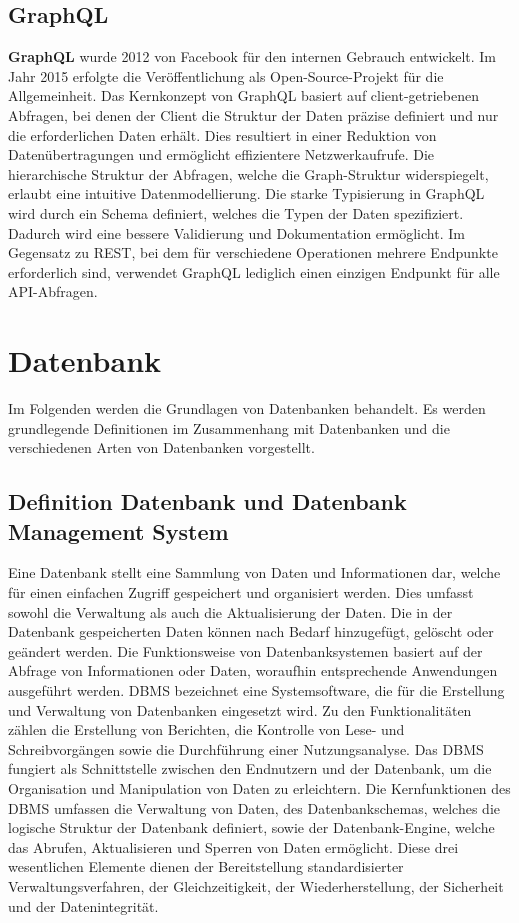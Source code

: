 \subsection{GraphQL} %
\label{sec:graphql}
\textbf{GraphQL} wurde 2012 von Facebook für den internen Gebrauch entwickelt. Im Jahr 2015 erfolgte die Veröffentlichung als Open-Source-Projekt für die Allgemeinheit. Das Kernkonzept von GraphQL basiert auf client-getriebenen Abfragen, bei denen der Client die Struktur der Daten präzise definiert und nur die erforderlichen Daten erhält. Dies resultiert in einer Reduktion von Datenübertragungen und ermöglicht effizientere Netzwerkaufrufe. Die hierarchische Struktur der Abfragen, welche die Graph-Struktur widerspiegelt, erlaubt eine intuitive Datenmodellierung. Die starke Typisierung in GraphQL wird durch ein Schema definiert, welches die Typen der Daten spezifiziert. Dadurch wird eine bessere Validierung und Dokumentation ermöglicht. Im Gegensatz zu REST, bei dem für verschiedene Operationen mehrere Endpunkte erforderlich sind, verwendet GraphQL lediglich einen einzigen Endpunkt für alle API-Abfragen.  \citep{graphqlreplacerest}

\section{Datenbank} %
\label{sec:datenbankGrundlagen}
Im Folgenden werden die Grundlagen von Datenbanken behandelt. Es werden grundlegende Definitionen im Zusammenhang mit Datenbanken und die verschiedenen Arten von Datenbanken vorgestellt.
\subsection{Definition Datenbank und Datenbank Management System} %
\label{sec:definitiondatenbank}
Eine Datenbank stellt eine Sammlung von Daten und Informationen dar, welche für einen einfachen Zugriff gespeichert und organisiert werden. Dies umfasst sowohl die Verwaltung als auch die Aktualisierung der Daten. Die in der Datenbank gespeicherten Daten können nach Bedarf hinzugefügt, gelöscht oder geändert werden. Die Funktionsweise von Datenbanksystemen basiert auf der Abfrage von Informationen oder Daten, woraufhin entsprechende Anwendungen ausgeführt werden. DBMS bezeichnet eine Systemsoftware, die für die Erstellung und Verwaltung von Datenbanken eingesetzt wird. Zu den Funktionalitäten zählen die Erstellung von Berichten, die Kontrolle von Lese- und Schreibvorgängen sowie die Durchführung einer Nutzungsanalyse. Das DBMS fungiert als Schnittstelle zwischen den Endnutzern und der Datenbank, um die Organisation und Manipulation von Daten zu erleichtern. Die Kernfunktionen des DBMS umfassen die Verwaltung von Daten, des Datenbankschemas, welches die logische Struktur der Datenbank definiert, sowie der Datenbank-Engine, welche das Abrufen, Aktualisieren und Sperren von Daten ermöglicht. Diese drei wesentlichen Elemente dienen der Bereitstellung standardisierter Verwaltungsverfahren, der Gleichzeitigkeit, der Wiederherstellung, der Sicherheit und der Datenintegrität. \citep{9677042}

